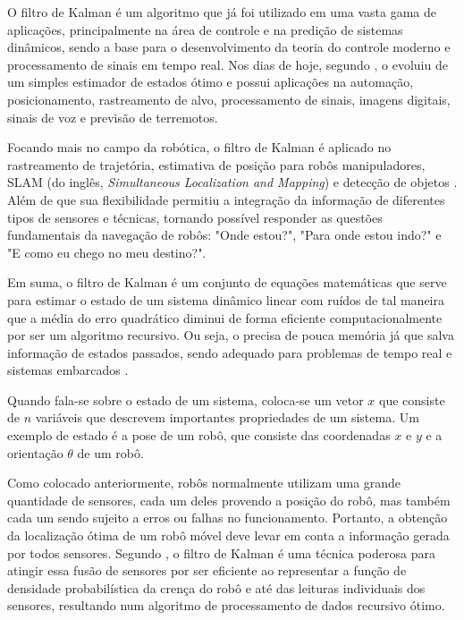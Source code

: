\documentclass[acronym, symbols, table, deposito]{fei}
\begin{document}
			O filtro de Kalman é um algoritmo que já foi utilizado em uma vasta gama de aplicações, principalmente na área de controle e na predição de sistemas dinâmicos, sendo a base para o desenvolvimento da teoria do controle moderno e processamento de sinais em tempo real. Nos dias de hoje, segundo \textcite{khodarahmi2023review}, o  evoluiu de um simples estimador de estados ótimo e possui aplicações na automação, posicionamento, rastreamento de alvo, processamento de sinais, imagens digitais, sinais de voz e previsão de terremotos.
			
			Focando mais no campo da robótica, o filtro de Kalman é aplicado no rastreamento de trajetória, estimativa de posição para robôs manipuladores, SLAM (do inglês, \textit{Simultaneous Localization and Mapping}) e detecção de objetos \cite{urrea2021kalman}. Além de que sua flexibilidade permitiu a integração da informação de diferentes tipos de sensores e técnicas, tornando possível responder as questões fundamentais da navegação de robôs: "Onde estou?", "Para onde estou indo?" e "E como eu chego no meu destino?".
			
			Em suma, o filtro de Kalman é um conjunto de equações matemáticas que serve para estimar o estado de um sistema dinâmico linear com ruídos de tal maneira que a média do erro quadrático diminui de forma eficiente computacionalmente por ser um algoritmo recursivo. Ou seja, o  precisa de pouca memória já que salva informação de estados passados, sendo adequado para problemas de tempo real e sistemas embarcados \cite{khodarahmi2023review}.
			
			Quando fala-se sobre o estado de um sistema, coloca-se um vetor $x$ que consiste de $n$ variáveis que descrevem importantes propriedades de um sistema. Um exemplo de estado é a pose de um robô, que consiste das coordenadas $x$ e $y$ e a orientação $\theta$ de um robô.
			
			Como colocado anteriormente, robôs normalmente utilizam uma grande quantidade de sensores, cada um deles provendo a posição do robô, mas também cada um sendo sujeito a erros ou falhas no funcionamento. Portanto, a obtenção da localização ótima de um robô móvel deve levar em conta a informação gerada por todos sensores. Segundo \textcite{siegwart2011introduction}, o filtro de Kalman é uma técnica poderosa para atingir essa fusão de sensores por ser eficiente ao representar a função de densidade probabilística da crença do robô e até das leituras individuais dos sensores, resultando num algoritmo de processamento de dados recursivo ótimo.
			
\end{document}
